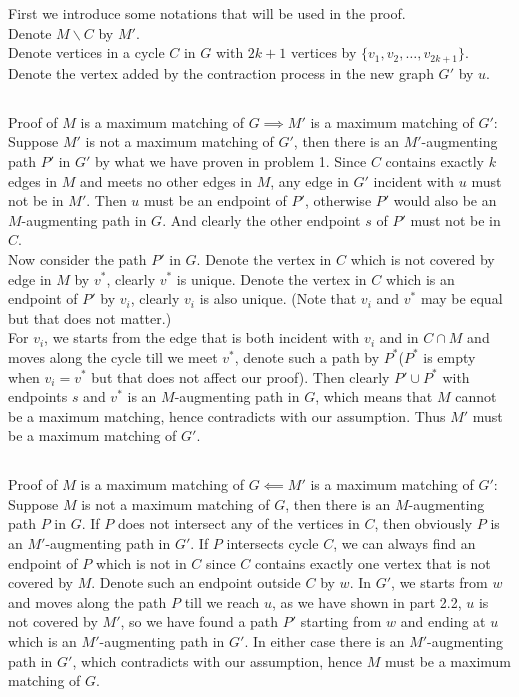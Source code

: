 \documentclass[12pt,letterpaper]{article}
\begin{document}
\section{}
First we introduce some notations that will be used in the proof.\\
Denote $M\backslash C$ by $M'$.\\
Denote vertices in a cycle $C$ in $G$ with $2k+1$ vertices by $\{v_1,v_2,\dots,v_{2k+1}\}$.\\
Denote the vertex added by the contraction process in the new graph $G'$ by $u$.
\subsection{}
Proof of $M$ is a maximum matching of $G \implies M'$ is a maximum matching of $G'$:\\
Suppose $M'$ is not a maximum matching of $G'$,
then there is an $M'$-augmenting path $P'$ in $G'$
by what we have proven in problem 1.
Since $C$ contains exactly $k$ edges in $M$ and meets no other edges in $M$,
any edge in $G'$ incident with $u$ must not be in $M'$.
Then $u$ must be an endpoint of $P'$,
otherwise $P'$ would also be an $M$-augmenting path in $G$.
And clearly the other endpoint $s$ of $P'$ must not be in $C$.\\
Now consider the path $P'$ in $G$. 
Denote the vertex in $C$ which is not covered by edge in $M$ by $v^*$,
clearly $v^*$ is unique.
Denote the vertex in $C$ which is an endpoint of $P'$ by $v_i$,
clearly $v_i$ is also unique. 
(Note that $v_i$ and $v^*$ may be equal but that does not matter.)\\
For $v_i$, we starts from the edge that is both incident with $v_i$ 
and in $C\cap M$ and moves along the cycle till we meet $v^*$,
denote such a path by $P^*$($P^*$ is empty when $v_i=v^*$ but that does not affect our proof).
Then clearly $P'\cup P^*$ with endpoints $s$ and $v^*$ is an $M$-augmenting path in $G$,
which means that $M$ cannot be a maximum matching, 
hence contradicts with our assumption.
Thus $M'$ must be a maximum matching of $G'$.

\subsection{}
Proof of $M$ is a maximum matching of $G \impliedby M'$ is a maximum matching of $G'$:\\
Suppose $M$ is not a maximum matching of $G$,
then there is an $M$-augmenting path $P$ in $G$.
If $P$ does not intersect any of the vertices in $C$,
then obviously $P$ is an $M'$-augmenting path in $G'$.
If $P$ intersects cycle $C$,
we can always find an endpoint of $P$ which is not in $C$
since $C$ contains exactly one vertex that is not covered by $M$.
Denote such an endpoint outside $C$ by $w$.
In $G'$, we starts from $w$ and moves along the path $P$ 
till we reach $u$,
as we have shown in part 2.2,
$u$ is not covered by $M'$,
so we have found a path $P'$ starting from $w$ and ending at $u$ 
which is an $M'$-augmenting path in $G'$.
In either case there is an $M'$-augmenting path in $G'$,
which contradicts with our assumption,
hence $M$ must be a maximum matching of $G$.
\end{document}
